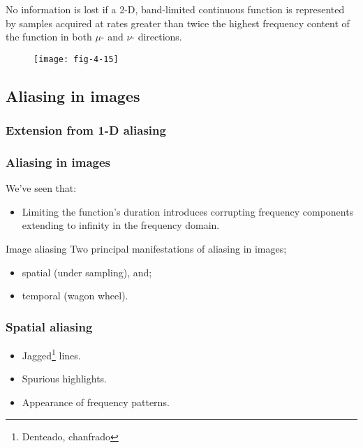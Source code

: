 
\begin{frame}
No information is lost if a 2-D, band-limited continuous function is represented by samples acquired at rates greater than twice the highest frequency content of the function in both $\mu$- and $\nu$- directions.
\begin{figure}
\centering
\texttt{[image: fig-4-15]}
\end{figure}
\end{frame}


\subsection{Aliasing in images}


\subsubsection{Extension from 1-D aliasing}


\begin{frame}
\frametitle{Aliasing in images}
We've seen that:
\begin{itemize}
\item Limiting the function's duration introduces corrupting
frequency components extending to infinity in the frequency domain.
\end{itemize}
\begin{block}{Image aliasing}
Two principal manifestations of aliasing in images;
\begin{itemize}
\item spatial (under sampling), and;
\item temporal (wagon wheel).
\end{itemize}
\end{block}
\end{frame}


\begin{frame}
\frametitle{Spatial aliasing}
\begin{itemize}
\item Jagged\footnote{Denteado, chanfrado} lines.
\item Spurious highlights.
\item Appearance of frequency patterns.
\end{itemize}
\end{frame}

